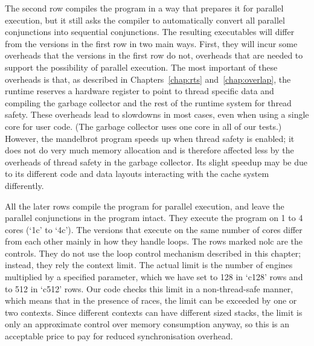 The second row
compiles the program in a way that prepares it for parallel execution,
but it still asks the compiler to automatically convert
all parallel conjunctions into sequential conjunctions.
The resulting executables will differ from the versions in the first row
in two main ways.
First, they will incur some overheads
that the versions in the first row do not,
overheads that are needed to support the possibility of parallel execution.
The most important of these overheads is that,
as described in Chapters~\ref{chap:rts} and~\ref{chap:overlap},
the runtime reserves a hardware register to point to thread specific data and
compiling
the garbage collector and the rest of the runtime system for thread safety.
These overheads lead to slowdowns in most cases,
even when using a single core for user code.
(The garbage collector uses one core in all of our tests.)
However, the mandelbrot program speeds up when thread safety is enabled;
it does not do very much memory allocation
and is therefore affected less by
the overheads of thread safety in the garbage collector.
Its slight speedup may be due to
its different code and data layouts
interacting with the cache system differently.

All the later rows
compile the program for parallel execution,
and leave the parallel conjunctions in the program intact.
They execute the program on 1 to 4 cores (`1c' to `4c').
The versions that execute on the same number of cores
differ from each other mainly in how they handle loops.
The rows marked nolc are the controls.
They do not use the loop control mechanism described in this chapter;
instead, they rely the context limit.
The actual limit is the number of engines
multiplied by a specified parameter,
which we have set to 128 in `c128' rows and to 512 in `c512' rows.
Our code checks this limit in a non-thread-safe manner,
which means that in the presence of races,
the limit can be exceeded by one or two contexts.
Since different contexts can have different sized stacks,
the limit is only an approximate control over memory consumption anyway,
so this is an acceptable price to pay for reduced synchronisation overhead.

